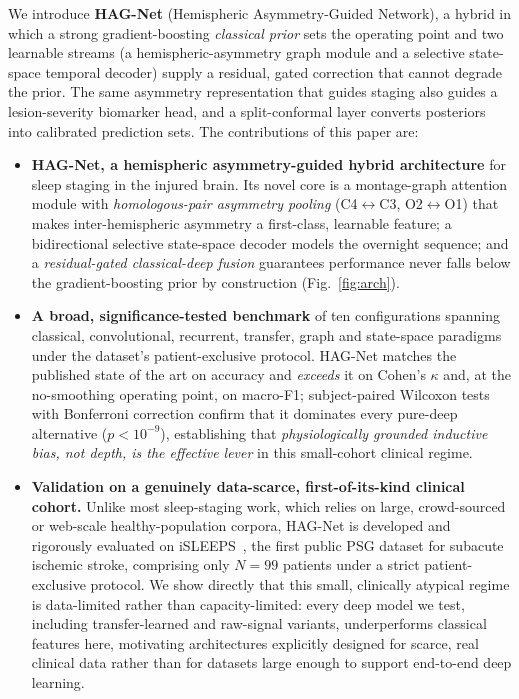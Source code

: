 \documentclass[journal]{IEEEtran}
\begin{document}
We introduce \textbf{HAG-Net} (Hemispheric Asymmetry-Guided Network), a hybrid in
which a strong gradient-boosting \emph{classical prior} sets the operating point
and two learnable streams (a hemispheric-asymmetry graph module and a selective
state-space temporal decoder) supply a residual, gated correction that cannot
degrade the prior. The same asymmetry representation that
guides staging also guides a lesion-severity biomarker head, and a split-conformal
layer converts posteriors into calibrated prediction sets. The contributions of
this paper are:

\begin{itemize}
\item \textbf{HAG-Net, a hemispheric asymmetry-guided hybrid architecture} for
sleep staging in the injured brain. Its novel core is a montage-graph attention
module with \emph{homologous-pair asymmetry pooling} (C4$\leftrightarrow$C3,
O2$\leftrightarrow$O1) that makes inter-hemispheric asymmetry a first-class,
learnable feature; a bidirectional selective state-space decoder models the
overnight sequence; and a \emph{residual-gated classical-deep fusion} guarantees
performance never falls below the gradient-boosting prior by construction
(Fig.~\ref{fig:arch}).
\item \textbf{A broad, significance-tested benchmark} of ten configurations
spanning classical, convolutional, recurrent, transfer, graph and state-space
paradigms under the dataset's patient-exclusive protocol. HAG-Net matches the
published state of the art on accuracy and \emph{exceeds} it on Cohen's $\kappa$
and, at the no-smoothing operating point, on macro-F1; subject-paired Wilcoxon
tests with Bonferroni correction confirm that it dominates every pure-deep
alternative ($p<10^{-9}$), establishing that \emph{physiologically grounded
inductive bias, not depth, is the effective lever} in this small-cohort clinical
regime.
\item \textbf{Validation on a genuinely data-scarce, first-of-its-kind clinical
cohort.} Unlike most sleep-staging work, which relies on large, crowd-sourced or
web-scale healthy-population corpora, HAG-Net is developed and rigorously
evaluated on iSLEEPS~\cite{maiti2026isleeps}, the first public PSG dataset for
subacute ischemic stroke, comprising only $N=99$ patients under a strict
patient-exclusive protocol. We show directly that this small, clinically atypical
regime is data-limited rather than capacity-limited: every deep model we test,
including transfer-learned and raw-signal variants, underperforms classical
features here, motivating architectures explicitly designed for scarce, real
clinical data rather than for datasets large enough to support end-to-end deep
learning.


\end{itemize}
\end{document}
